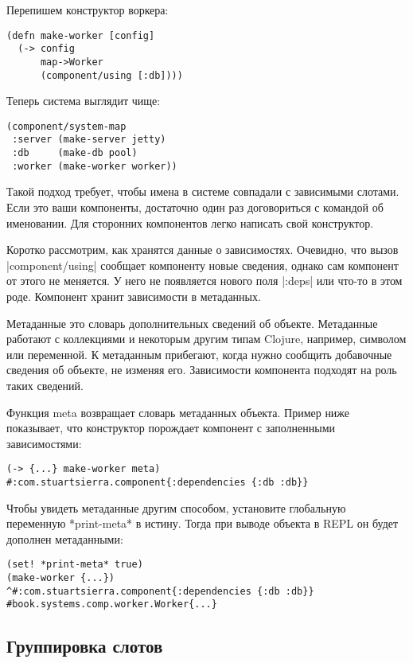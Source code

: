 Перепишем конструктор воркера:

\begin{verbatim}
(defn make-worker [config]
  (-> config
      map->Worker
      (component/using [:db])))
\end{verbatim}

Теперь система выглядит чище:

\begin{verbatim}
(component/system-map
 :server (make-server jetty)
 :db     (make-db pool)
 :worker (make-worker worker))
\end{verbatim}

Такой подход требует, чтобы имена в системе совпадали с зависимыми слотами. Если
это ваши компоненты, достаточно один раз договориться с командой об
именовании. Для сторонних компонентов легко написать свой конструктор.

Коротко рассмотрим, как хранятся данные о зависимостях. Очевидно, что вызов
\spverb|component/using| сообщает компоненту новые сведения, однако сам компонент от
этого не меняется. У него не появляется нового поля \spverb|:deps| или что-то в этом
роде. Компонент хранит зависимости в метаданных.

Метаданные это словарь дополнительных сведений об объекте. Метаданные работают с
коллекциями и некоторым другим типам Clojure, например, символом или
переменной. К метаданным прибегают, когда нужно сообщить добавочные сведения об
объекте, не изменяя его. Зависимости компонента подходят на роль таких сведений.

Функция meta возвращает словарь метаданных объекта. Пример ниже показывает, что
конструктор порождает компонент с заполненными зависимостями:

\begin{verbatim}
(-> {...} make-worker meta)
#:com.stuartsierra.component{:dependencies {:db :db}}
\end{verbatim}

Чтобы увидеть метаданные другим способом, установите глобальную переменную
*print-meta* в истину. Тогда при выводе объекта в REPL он будет дополнен
метаданными:

\begin{verbatim}
(set! *print-meta* true)
(make-worker {...})
^#:com.stuartsierra.component{:dependencies {:db :db}}
#book.systems.comp.worker.Worker{...}
\end{verbatim}

\subsection{Группировка слотов}


